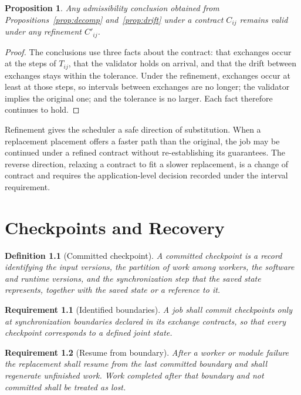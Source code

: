\documentclass[11pt,openany]{book}
\newtheorem{definition}{Definition}[chapter]
\newtheorem{proposition}{Proposition}[chapter]
\newtheorem{requirement}{Requirement}[chapter]
\theoremstyle{remark}
\begin{document}
\begin{proposition}\label{prop:refine}
Any admissibility conclusion obtained from Propositions~\ref{prop:decomp} and~\ref{prop:drift} under a contract $C_{ij}$ remains valid under any refinement $C'_{ij}$.
\end{proposition}
\begin{proof}
The conclusions use three facts about the contract: that exchanges occur at the steps of $T_{ij}$, that the validator holds on arrival, and that the drift between exchanges stays within the tolerance. Under the refinement, exchanges occur at least at those steps, so intervals between exchanges are no longer; the validator implies the original one; and the tolerance is no larger. Each fact therefore continues to hold.
\end{proof}

Refinement gives the scheduler a safe direction of substitution. When a replacement placement offers a faster path than the original, the job may be continued under a refined contract without re-establishing its guarantees. The reverse direction, relaxing a contract to fit a slower replacement, is a change of contract and requires the application-level decision recorded under the interval requirement.

\chapter{Checkpoints and Recovery}

\begin{definition}[Committed checkpoint]
A committed checkpoint is a record identifying the input versions, the partition of work among workers, the software and runtime versions, and the synchronization step that the saved state represents, together with the saved state or a reference to it.
\end{definition}

\begin{requirement}[Identified boundaries]
A job shall commit checkpoints only at synchronization boundaries declared in its exchange contracts, so that every checkpoint corresponds to a defined joint state.
\end{requirement}

\begin{requirement}[Resume from boundary]
After a worker or module failure the replacement shall resume from the last committed boundary and shall regenerate unfinished work. Work completed after that boundary and not committed shall be treated as lost.
\end{requirement}
\end{document}
